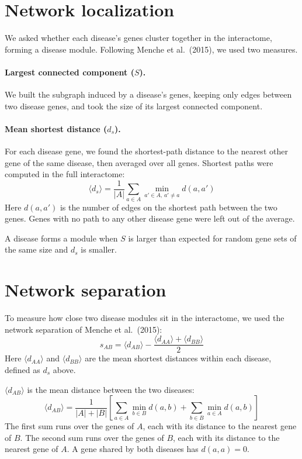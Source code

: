 \documentclass[11pt]{article}
\begin{document}
\section{Network localization}

We asked whether each disease's genes cluster together in the interactome, forming a disease module. Following Menche et al.\ (2015), we used two measures.

\paragraph{Largest connected component ($S$).} We built the subgraph induced by a disease's genes, keeping only edges between two disease genes, and took the size of its largest connected component.

\paragraph{Mean shortest distance ($d_s$).} For each disease gene, we found the shortest-path distance to the nearest other gene of the same disease, then averaged over all genes. Shortest paths were computed in the full interactome:
\begin{equation}
  \langle d_s \rangle = \frac{1}{|A|} \sum_{a \in A} \min_{a' \in A,\, a' \neq a} d(a, a')
\end{equation}
Here $d(a, a')$ is the number of edges on the shortest path between the two genes. Genes with no path to any other disease gene were left out of the average.

A disease forms a module when $S$ is larger than expected for random gene sets of the same size and $d_s$ is smaller.

\section{Network separation}

To measure how close two disease modules sit in the interactome, we used the network separation of Menche et al.\ (2015):
\begin{equation}
  s_{AB} = \langle d_{AB} \rangle - \frac{\langle d_{AA} \rangle + \langle d_{BB} \rangle}{2}
\end{equation}
Here $\langle d_{AA} \rangle$ and $\langle d_{BB} \rangle$ are the mean shortest distances within each disease, defined as $d_s$ above.

$\langle d_{AB} \rangle$ is the mean distance between the two diseases:
\begin{equation}
  \langle d_{AB} \rangle = \frac{1}{|A| + |B|} \left[ \sum_{a \in A} \min_{b \in B} d(a, b) + \sum_{b \in B} \min_{a \in A} d(a, b) \right]
\end{equation}
The first sum runs over the genes of $A$, each with its distance to the nearest gene of $B$. The second sum runs over the genes of $B$, each with its distance to the nearest gene of $A$. A gene shared by both diseases has $d(a, a) = 0$.
\end{document}
